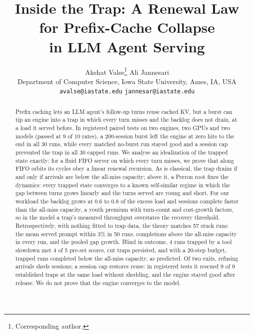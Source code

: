 \documentclass[10pt,twocolumn]{article}
\title{Inside the Trap: A Renewal Law for Prefix-Cache Collapse\\ in LLM Agent Serving}
\author{Akshat Valse\thanks{Corresponding author.} \qquad Ali Jannesari\\[2pt]
Department of Computer Science, Iowa State University, Ames, IA, USA\\[2pt]
\texttt{avalse@iastate.edu} \qquad \texttt{jannesar@iastate.edu}}
\date{}
\theoremstyle{remark}
\begin{document}
\maketitle

\begin{abstract}
Prefix caching lets an LLM agent's follow-up turns reuse cached KV, but a burst can tip an engine into a trap in which every turn misses and the backlog does not drain, at a load it served before. In registered paired tests on two engines, two GPUs and two models (passed at 9 of 10 rates), a 200-session burst left the engine at zero hits to the end in all 30 runs, while every matched no-burst run stayed good and a session cap prevented the trap in all 30 capped runs. We analyse an idealization of the trapped state exactly: for a fluid FIFO server on which every turn misses, we prove that along FIFO orbits its cycles obey a linear renewal recursion. As is classical, the trap drains if and only if arrivals are below the all-miss capacity; above it, a Perron root fixes the dynamics: every trapped state converges to a known self-similar regime in which the gap between turns grows linearly and the turns served are young and short. For our workload the backlog grows at 0.6 to 0.8 of the excess load and sessions complete faster than the all-miss capacity, a youth premium with turn-count and cost-growth factors, so in the model a trap's measured throughput overstates the recovery threshold. Retrospectively, with nothing fitted to trap data, the theory matches 57 stuck runs: the mean served prompt within 3\% in 50 runs, completions above the all-miss capacity in every run, and the pooled gap growth. Blind in outcome, 4 runs trapped by a tool slowdown met 4 of 5 pre-set scores, cut traps persisted, and with a 20-step budget, trapped runs completed below the all-miss capacity, as predicted. Of two exits, refusing arrivals sheds sessions; a session cap restores reuse: in registered tests it rescued 9 of 9 established traps at the same load without shedding, and the engine stayed good after release. We do not prove that the engine converges to the model.
\end{abstract}








\end{document}

